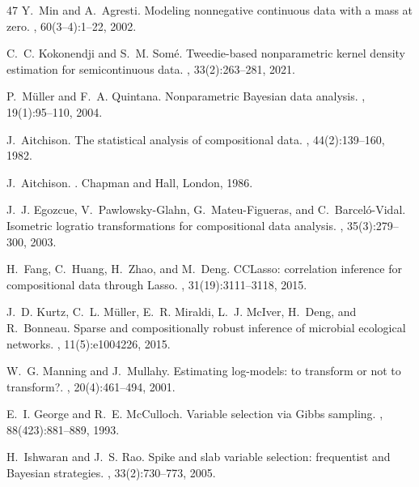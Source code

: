\documentclass[11pt, a4paper]{article}
\begin{document}
\begin{thebibliography}{47}
Y.~Min and A.~Agresti.
\newblock Modeling nonnegative continuous data with a mass at zero.
, 60(3--4):1--22, 2002.

C.~C. Kokonendji and S.~M. Som{\'e}.
\newblock Tweedie-based nonparametric kernel density estimation for semicontinuous data.
, 33(2):263--281, 2021.

P.~M{\"u}ller and F.~A. Quintana.
\newblock Nonparametric Bayesian data analysis.
, 19(1):95--110, 2004.

J.~Aitchison.
\newblock The statistical analysis of compositional data.
, 44(2):139--160, 1982.

J.~Aitchison.
.
\newblock Chapman and Hall, London, 1986.

J.~J. Egozcue, V.~Pawlowsky-Glahn, G.~Mateu-Figueras, and C.~Barcel{\'o}-Vidal.
\newblock Isometric logratio transformations for compositional data analysis.
, 35(3):279--300, 2003.

H.~Fang, C.~Huang, H.~Zhao, and M.~Deng.
\newblock CCLasso: correlation inference for compositional data through Lasso.
, 31(19):3111--3118, 2015.

J.~D. Kurtz, C.~L. M{\"u}ller, E.~R. Miraldi, L.~J. McIver, H.~Deng, and R.~Bonneau.
\newblock Sparse and compositionally robust inference of microbial ecological networks.
, 11(5):e1004226, 2015.

W.~G. Manning and J.~Mullahy.
\newblock Estimating log-models: to transform or not to transform?.
, 20(4):461--494, 2001.

E.~I. George and R.~E. McCulloch.
\newblock Variable selection via Gibbs sampling.
, 88(423):881--889, 1993.

H.~Ishwaran and J.~S. Rao.
\newblock Spike and slab variable selection: frequentist and Bayesian strategies.
, 33(2):730--773, 2005.


\end{thebibliography}
\end{document}
